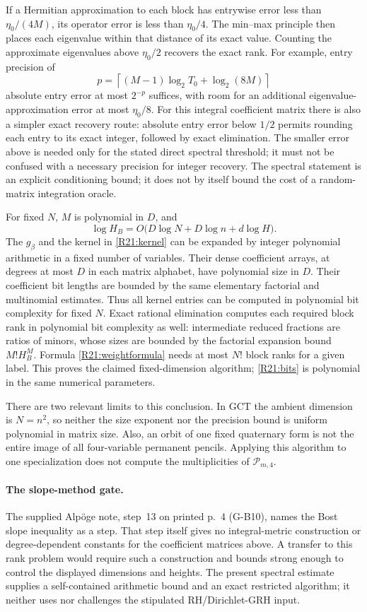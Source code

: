 \documentclass[11pt,a4paper]{article}
\theoremstyle{definition}\newtheorem{definition}{Definition}
\begin{document}
If a Hermitian approximation to each block has entrywise error
less than $\eta_0/(4M)$, its operator error is less than
$\eta_0/4$. The min--max principle then places each eigenvalue
within that distance of its exact value. Counting the approximate
eigenvalues above $\eta_0/2$ recovers the exact rank. For example,
entry precision of
\begin{equation}\label{R21:bits}
 p=\left\lceil (M-1)\log_2T_0+\log_2(8M)\right\rceil
\end{equation}
absolute entry error at most $2^{-p}$ suffices, with room for an
additional eigenvalue-approximation error at most $\eta_0/8$. For this integral coefficient matrix there is also a simpler exact
recovery route: absolute entry error below $1/2$ permits rounding each
entry to its exact integer, followed by exact elimination. The smaller
error above is needed only for the stated direct spectral threshold;
it must not be confused with a necessary precision for integer recovery.
The spectral statement is an explicit conditioning bound; it does not by itself bound the cost of a
random-matrix integration oracle.

For fixed $N$, $M$ is polynomial in $D$, and
\[
 \log H_B=O\bigl(D\log N+D\log n+d\log H\bigr).
\]
The $g_\beta$ and the kernel in \eqref{R21:kernel} can be expanded
by integer polynomial arithmetic in a fixed number of variables.
Their dense coefficient arrays, at degrees at most $D$ in each
matrix alphabet, have polynomial size in $D$.
Their coefficient bit lengths are bounded by the same elementary
factorial and multinomial estimates. Thus all kernel entries can
be computed in polynomial bit complexity for fixed $N$.
Exact rational elimination computes each required block rank in
polynomial bit complexity as well: intermediate reduced fractions
are ratios of minors, whose sizes are bounded by the factorial
expansion bound $M!H_B^M$. Formula \eqref{R21:weightformula} needs
at most $N!$ block ranks for a given label. This proves the claimed
fixed-dimension algorithm; \eqref{R21:bits} is polynomial in the
same numerical parameters.

There are two relevant limits to this conclusion. In GCT the ambient
dimension is $N=n^2$, so neither the size exponent nor the precision
bound is uniform polynomial in matrix size. Also, an orbit of one
fixed quaternary form is not the entire image of all four-variable
permanent pencils. Applying this algorithm to one specialization
does not compute the multiplicities of $\mathcal P_{m,4}$.

\paragraph{The slope-method gate.}
The supplied Alp\"oge note, step~13 on printed p.~4 (G-B10), names
the Bost slope inequality as a step. That step itself gives no integral-metric construction or
degree-dependent constants for the coefficient matrices above. A transfer to this rank problem would require such
a construction and bounds strong enough to control the displayed
dimensions and heights. The present spectral estimate supplies a
self-contained arithmetic bound and an exact restricted algorithm;
it neither uses nor challenges the stipulated RH/Dirichlet-GRH input.
\end{document}
